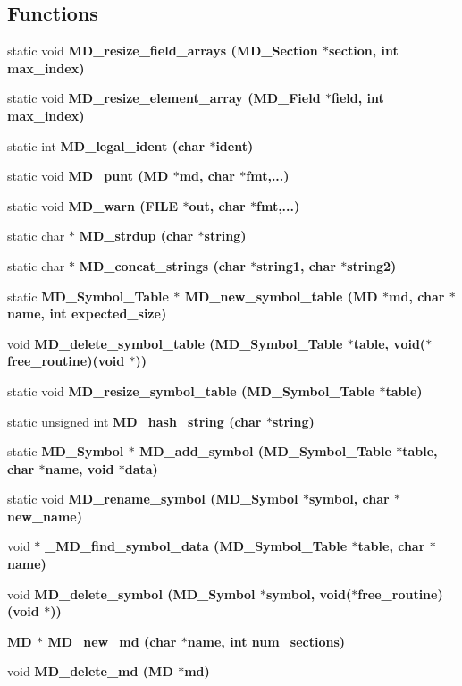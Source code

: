 \subsection*{Functions}
\begin{CompactItemize}
\item 
static void \bf{MD\_\-resize\_\-field\_\-arrays} (\bf{MD\_\-Section} $\ast$section, int max\_\-index)
\item 
static void \bf{MD\_\-resize\_\-element\_\-array} (\bf{MD\_\-Field} $\ast$field, int max\_\-index)
\item 
static int \bf{MD\_\-legal\_\-ident} (char $\ast$ident)
\item 
static void \bf{MD\_\-punt} (\bf{MD} $\ast$md, char $\ast$fmt,...)
\item 
static void \bf{MD\_\-warn} (FILE $\ast$out, char $\ast$fmt,...)
\item 
static char $\ast$ \bf{MD\_\-strdup} (char $\ast$string)
\item 
static char $\ast$ \bf{MD\_\-concat\_\-strings} (char $\ast$string1, char $\ast$string2)
\item 
static \bf{MD\_\-Symbol\_\-Table} $\ast$ \bf{MD\_\-new\_\-symbol\_\-table} (\bf{MD} $\ast$md, char $\ast$\bf{name}, int expected\_\-size)
\item 
void \bf{MD\_\-delete\_\-symbol\_\-table} (\bf{MD\_\-Symbol\_\-Table} $\ast$table, void($\ast$free\_\-routine)(void $\ast$))
\item 
static void \bf{MD\_\-resize\_\-symbol\_\-table} (\bf{MD\_\-Symbol\_\-Table} $\ast$table)
\item 
static unsigned int \bf{MD\_\-hash\_\-string} (char $\ast$string)
\item 
static \bf{MD\_\-Symbol} $\ast$ \bf{MD\_\-add\_\-symbol} (\bf{MD\_\-Symbol\_\-Table} $\ast$table, char $\ast$\bf{name}, void $\ast$data)
\item 
static void \bf{MD\_\-rename\_\-symbol} (\bf{MD\_\-Symbol} $\ast$symbol, char $\ast$new\_\-name)
\item 
void $\ast$ \bf{\_\-MD\_\-find\_\-symbol\_\-data} (\bf{MD\_\-Symbol\_\-Table} $\ast$table, char $\ast$\bf{name})
\item 
void \bf{MD\_\-delete\_\-symbol} (\bf{MD\_\-Symbol} $\ast$symbol, void($\ast$free\_\-routine)(void $\ast$))
\item 
\bf{MD} $\ast$ \bf{MD\_\-new\_\-md} (char $\ast$\bf{name}, int num\_\-sections)
\item 
void \bf{MD\_\-delete\_\-md} (\bf{MD} $\ast$md)
\item 

\end{CompactItemize}
